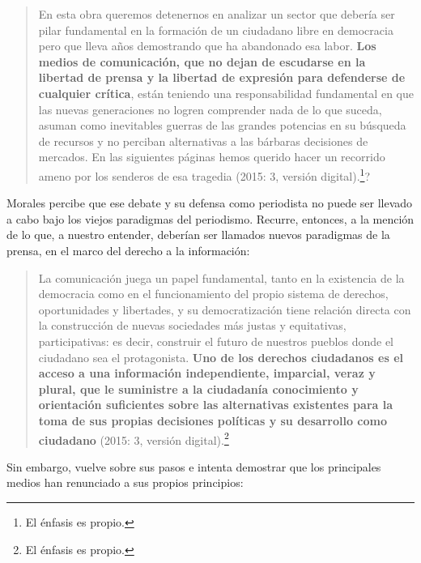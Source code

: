 {\begin{quote}
En esta obra queremos detenernos en analizar un sector que debería ser pilar fundamental en la formación de un ciudadano libre en democracia pero que lleva años demostrando que ha abandonado esa labor. \textbf{Los medios de comunicación, que no dejan de escudarse en la libertad de prensa y la libertad de expresión para defenderse de cualquier crítica}, están teniendo una responsabilidad fundamental en que las nuevas generaciones no logren comprender nada de lo que suceda, asuman como inevitables guerras de las grandes potencias en su búsqueda de recursos y no perciban alternativas a las bárbaras decisiones de mercados. En las siguientes páginas hemos querido hacer un recorrido ameno por los senderos de esa tragedia (2015: 3, versión digital).\footnote{El énfasis es propio.}?
\end{quote}

Morales percibe que ese debate y su defensa como periodista no puede ser llevado a cabo bajo los viejos paradigmas del periodismo. Recurre, entonces, a la mención de lo que, a nuestro entender, deberían ser llamados nuevos paradigmas de la prensa, en el marco del derecho a la información:

\begin{quote}
La comunicación juega un papel fundamental, tanto en la existencia de la democracia como en el funcionamiento del propio sistema de derechos, oportunidades y libertades, y su democratización tiene relación directa con la construcción de nuevas sociedades más justas y equitativas, participativas: es decir, construir el futuro de nuestros pueblos donde el ciudadano sea el protagonista. \textbf{Uno de los derechos ciudadanos es el acceso a una información independiente, imparcial, veraz y plural, que le suministre a la ciudadanía conocimiento y orientación suficientes sobre las alternativas existentes para la toma de sus propias decisiones políticas y su desarrollo como ciudadano} (2015: 3, versión digital).\footnote{El énfasis es propio.}
\end{quote}

Sin embargo, vuelve sobre sus pasos e intenta demostrar que los principales medios han renunciado a sus propios principios:

}
